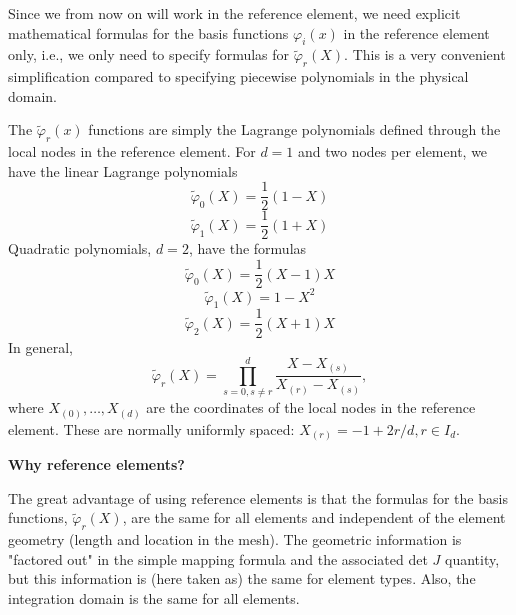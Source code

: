 \documentclass[../main.tex]{subfiles}
\begin{document}
	Since we from now on will work in the reference element, we need explicit mathematical formulas for the basis functions $\varphi_{i}(x)$ in the reference element only, i.e., we only need to specify formulas for $\tilde{\varphi}_{r}(X)$. This is a very convenient simplification compared to specifying piecewise polynomials in the physical domain.
	
	The $\tilde{\varphi}_{r}(x)$ functions are simply the Lagrange polynomials defined through the local nodes in the reference element. For $d=1$ and two nodes per element, we have the linear Lagrange polynomials
	\begin{equation}\label{eqa67}
		\tilde{\varphi}_{0}(X) =\frac{1}{2}(1-X)
	\end{equation}
	\begin{equation}\label{eqa68}
		\tilde{\varphi}_{1}(X) =\frac{1}{2}(1+X)
	\end{equation}
	Quadratic polynomials, $d=2$, have the formulas
	\begin{equation}\label{eqa69}
		\tilde{\varphi}_{0}(X) =\frac{1}{2}(X-1) X
	\end{equation}
	\begin{equation}\label{eqa70}
		\tilde{\varphi}_{1}(X) =1-X^{2}
	\end{equation}
	\begin{equation}\label{eqa71}
		\tilde{\varphi}_{2}(X) =\frac{1}{2}(X+1)X
	\end{equation}
	In general,
	\begin{equation}\label{eqa72}
		\tilde{\varphi}_{r}(X)=\prod_{s=0, s \neq r}^{d} \frac{X-X_{(s)}}{X_{(r)}-X_{(s)}},
	\end{equation}
	where $X_{(0)}, \ldots, X_{(d)}$ are the coordinates of the local nodes in the reference element. These are normally uniformly spaced: $X_{(r)}=-1+2 r / d, r \in I_{d}$.
	\begin{mybox}
		\textbf{Why reference elements?}
		
		\noindent The great advantage of using reference elements is that the formulas for the basis functions, $\tilde{\varphi}_{r}(X)$, are the same for all elements and independent of the element geometry (length and location in the mesh). The geometric information is "factored out" in the simple mapping formula and the associated det $J$ quantity, but this information is (here taken as) the same for element types. Also, the integration domain is the same for all elements.
	\end{mybox}
	
	
\end{document}
